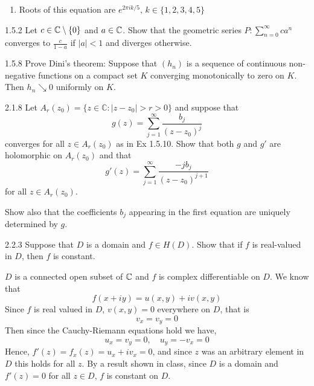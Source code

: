 \documentclass[12pt]{article}
\begin{document}
\begin{solution}
\begin{enumerate}
        \item Roots of this equation are $e^{2 \pi i k/5}, \, k \in \{1, 2, 3, 4, 5\}$ \todo{}
        

    \end{enumerate}
\end{solution}


\begin{problem}{1.5.2}
    Let $c \in \mathbb C \setminus \{0\}$ and $a \in \mathbb C$. Show that the geometric series $P: \sum_{n=0}^\infty ca^n$ converges to $\frac{c}{1-a}$ if $|a| < 1$ and diverges otherwise. 
\end{problem}
\begin{solution}
        \bbni

\end{solution}


\begin{problem}{1.5.8}
    Prove Dini's theorem: Suppose that $(h_n)$ is a sequence of continuous non-negative functions on a compact set $K$ converging monotonically to zero on $K$. Then $h_n \searrow 0$ uniformly on $K$. 
\end{problem}

\begin{solution}
       \bbni

\end{solution}


\begin{problem}{2.1.8}
    Let \( A_r(z_0) = \{ z \in \mathbb{C} : |z - z_0| > r > 0 \} \) and suppose that
    \[ g(z) = \sum_{j=1}^{\infty} \frac{b_j}{(z - z_0)^j} \]
    converges for all \( z \in A_r(z_0) \) as in Ex 1.5.10. Show that both \( g \) and \( g' \) are holomorphic on \( A_r(z_0) \) and that
    \[ g'(z) = \sum_{j=1}^{\infty} \frac{-j b_j}{(z - z_0)^{j+1}} \]
    for all \( z \in A_r(z_0) \).

    Show also that the coefficients \( b_j \) appearing in the first equation are uniquely determined by \( g \).
\end{problem}
\begin{solution}
   
\end{solution}

\begin{problem}{2.2.3}
    Suppose that $D$ is a domain and $f \in H(D)$. Show that if $f$ is real-valued in $D$, then $f$ is constant. 
\end{problem}

\begin{solution}
        \bbni
        $D$ is a connected open subset of $\mathbb C$ and $f$ is complex differentiable on $D$. We know that 
        \[f(x + iy) = u(x,y) + iv(x,y)\]
        Since $f$ is real valued in $D$, $v(x,y) = 0$ everywhere on $D$, that is 
        \[v_x = v_y = 0\]
        Then since the Cauchy-Riemann equations hold we have, 
        \[u_x = v_y = 0, \quad u_y = -v_x = 0\]
        Hence, $f'(z) = f_x(z) = u_x + i v_x = 0$, and since $z$ was an arbitrary element in $D$ this holds for all $z$. By a result shown in class, since $D$ is a domain and $f'(z) = 0$ for all $z \in D$, $f$ is constant on $D$. 
\end{solution}
\end{document}

